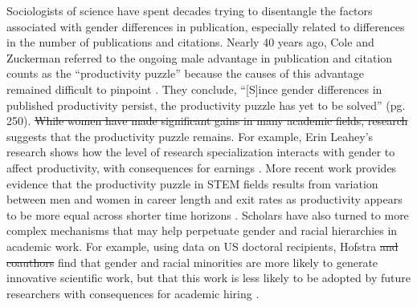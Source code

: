 \documentclass[
  10pt,
  letterpaper,
]{article}
\providecommand{\DIFaddtex}[1]{{\protect\color{blue}\uwave{#1}}} %
\providecommand{\DIFdeltex}[1]{{\protect\color{red}\sout{#1}}}                      %
\providecommand{\DIFaddbegin}{} %
\providecommand{\DIFaddend}{} %
\providecommand{\DIFdelbegin}{} %
\providecommand{\DIFdelend}{} %
\providecommand{\DIFadd}[1]{\texorpdfstring{\DIFaddtex{#1}}{#1}} %
\providecommand{\DIFdel}[1]{\texorpdfstring{\DIFdeltex{#1}}{}} %
\newcommand{\DIFscaledelfig}{0.5}
\newlength{\DIFdelgraphicswidth} %
\newlength{\DIFdelgraphicsheight} %
\newcommand{\DIFaddincludegraphics}[2][]{{\color{blue}\fbox{\DIFOincludegraphics[#1]{#2}}}} %
\newcommand{\DIFdelincludegraphics}[2][]{%
\sbox{\DIFdelgraphicsbox}{\DIFOincludegraphics[#1]{#2}}%
\settoboxwidth{\DIFdelgraphicswidth}{\DIFdelgraphicsbox} %
\settoboxtotalheight{\DIFdelgraphicsheight}{\DIFdelgraphicsbox} %
\scalebox{\DIFscaledelfig}{%
\parbox[b]{\DIFdelgraphicswidth}{\usebox{\DIFdelgraphicsbox}\\[-\baselineskip] \rule{\DIFdelgraphicswidth}{0em}}\llap{\resizebox{\DIFdelgraphicswidth}{\DIFdelgraphicsheight}{%
\setlength{\unitlength}{\DIFdelgraphicswidth}%
\begin{picture}(1,1)%
\thicklines\linethickness{2pt} %
{\color[rgb]{1,0,0}\put(0,0){\framebox(1,1){}}}%
{\color[rgb]{1,0,0}\put(0,0){\line( 1,1){1}}}%
{\color[rgb]{1,0,0}\put(0,1){\line(1,-1){1}}}%
\end{picture}%
}\hspace*{3pt}}} %
} %
\DeclareRobustCommand{\DIFaddbegin}{\DIFOaddbegin \let\includegraphics\DIFaddincludegraphics} %
\DeclareRobustCommand{\DIFaddend}{\DIFOaddend \let\includegraphics\DIFOincludegraphics} %
\DeclareRobustCommand{\DIFdelbegin}{\DIFOdelbegin \let\includegraphics\DIFdelincludegraphics} %
\DeclareRobustCommand{\DIFdelend}{\DIFOaddend \let\includegraphics\DIFOincludegraphics} %
\begin{document}
Sociologists of science have spent decades trying to disentangle the
factors associated with gender differences in publication, especially
related to differences in the number of publications and citations.
Nearly 40 years ago, Cole and Zuckerman referred to the ongoing male
advantage in publication and citation counts as the ``productivity
puzzle'' because the causes of this advantage remained difficult to
pinpoint \citep{cole_productivity_1984}. They conclude, ``{[}S{]}ince
gender differences in published productivity persist, the productivity
puzzle has yet to be solved'' (pg. 250). \DIFdelbegin \DIFdel{While women have made
significant gains in many academic fields, research }\DIFdelend \DIFaddbegin \DIFadd{Research }\DIFaddend suggests that the
productivity puzzle remains. For example, Erin Leahey's research shows
how the level of research specialization interacts with gender to affect
productivity, with consequences for earnings
\citep{leahey_gender_2006, leahey_not_2007}. More recent work provides
evidence that the productivity puzzle in STEM fields results from
variation between men and women in career length and exit rates as
productivity appears to be more equal across shorter time horizons
\citep{huang_historical_2020}. Scholars have also turned to more complex
mechanisms that may help perpetuate gender and racial hierarchies in
academic work. For example, using data on US doctoral recipients,
Hofstra \DIFdelbegin \DIFdel{and coauthors }\DIFdelend \DIFaddbegin \DIFadd{et. al.~}\DIFaddend find that gender and racial minorities are more likely
to generate innovative scientific work, but that this work is less
likely to be adopted by future researchers with consequences for
academic hiring \citep{hofstra_diversity_2020}.
\end{document}
